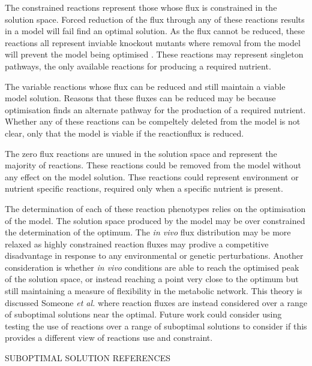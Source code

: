 The constrained reactions represent those whose flux is constrained in the solution space. Forced reduction of the flux through any of these reactions results in a model will fail find an optimal solution. As the flux cannot be reduced, these reactions all represent inviable knockout mutants where removal from the model will prevent the model being optimised \cite{in_silico_knockout}. These reactions may represent singleton pathways, the only available reactions for producing a required nutrient.

The variable reactions whose flux can be reduced and still maintain a viable model solution. Reasons that these fluxes can be reduced may be because optimisation finds an alternate pathway for the production of a required nutrient. Whether any of these reactions can be compeltely deleted from the model is not clear, only that the model is viable if the reactionflux is reduced.

The zero flux reactions are unused in the solution space and represent the majority of reactions. These reactions could be removed from the model without any effect on the model solution. Thse reactions could represent environment or nutrient specific reactions, required only when a specific nutrient is present.

The determination of each of these reaction phenotypes relies on the optimisation of the model. The solution space produced by the model may be over constrained the determination of the optimum. The \emph{in vivo} flux distribution may be more relaxed as highly constrained reaction fluxes may prodive a competitive disadvantage in response to any environmental or genetic perturbations. Another consideration is whether \emph{in vivo} conditions are able to reach the optimised peak of the solution space, or instead reaching a point very close to the optimum but still maintaining a measure of flexibility in the metabolic network. This theory is discussed Someone \emph{et al.} \cite{suboptimal_solutions} where reaction fluxes are instead considered over a range of suboptimal solutions near the optimal. Future work could consider using testing the use of reactions over a range of suboptimal solutions to consider if this provides a different view of reactions use and constraint.

SUBOPTIMAL SOLUTION REFERENCES
